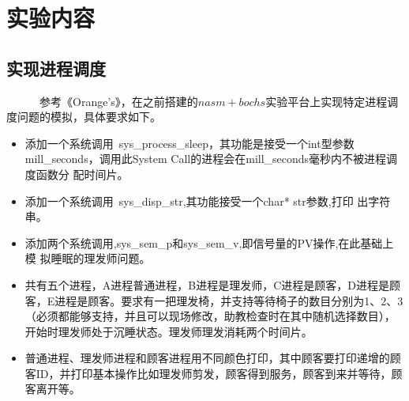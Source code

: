\documentclass[a4paper]{article}
\title{\Huge \heiti{操作系统实验（四）}}
\author{\lishu{南京大学软件学院}}
\date{\normalsize 2015.5}
\begin{document}
\maketitle

\renewcommand{\abstractname}{实验重点}

\begin{abstract}
本次作业重点：操作系统的进程，系统调用，PV操作以及进程调度的实现。
\end{abstract}

\section{实验内容}
\subsection{实现进程调度}
~~~~~~参考《Orange's》，在之前搭建的$nasm+bochs$实验平台上实现特定进程调度问题的模拟，具体要求如下。
	\begin{itemize}
		\item 添加一个系统调用~sys\_process\_sleep，其功能是接受一个int型参数
mill\_seconds，调用此System Call的进程会在mill\_seconds毫秒内不被进程调度函数分
配时间片。
		\item 添加一个系统调用~sys\_disp\_str,其功能接受一个char* str参数,打印
出字符串。
		\item 添加两个系统调用,sys\_sem\_p和sys\_sem\_v,即信号量的PV操作,在此基础上模
拟睡眠的理发师问题。
		
		\item 共有五个进程，A进程普通进程，B进程是理发师，C进程是顾客，D进程是顾客，E进程是顾客。要求有一把理发椅，并支持等待椅子的数目分别为1、2、3（必须都能够支持，并且可以现场修改，助教检查时在其中随机选择数目），开始时理发师处于沉睡状态。理发师理发消耗两个时间片。
		\item 普通进程、理发师进程和顾客进程用不同颜色打印，其中顾客要打印递增的顾客ID，并打印基本操作比如理发师剪发，顾客得到服务，顾客到来并等待，顾客离开等。
		
	\end{itemize}
\end{document}
